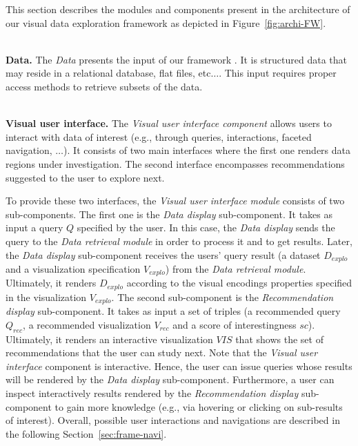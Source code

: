 This section describes the modules and components present in the architecture of our visual data exploration framework as depicted in Figure~\ref{fig:archi-FW}.

~~\\
\noindent \textbf{Data.}
The \emph{Data} presents the input of our framework \framework{}.
It is structured data that may reside in a relational database, flat files, etc$\ldots$. This input requires proper access methods to retrieve subsets of the data.

~~\\
\noindent \textbf{Visual user interface.}
The \emph{Visual user interface component} allows users to interact with data of interest (e.g.,  through queries, interactions, faceted navigation, $\ldots$).
It consists of two main interfaces where the first one renders data regions under investigation. The second interface encompasses recommendations suggested to the user to explore next.

To provide these two interfaces, the \emph{Visual user interface module} consists of two sub-components. The first one is the \emph{Data display} sub-component. 
It takes as input a query $Q$ specified by the user. In this case, the \emph{Data display} sends the query
to the \emph{Data retrieval module} in order to process it and to get results.
Later, the \emph{Data display} sub-component receives the users' query result (a dataset $D_{explo}$ and a visualization specification $V_{explo}$) from the \emph{Data retrieval module}.
Ultimately, it renders $D_{explo}$ according to the visual encodings properties specified in the visualization $V_{explo}$.
The second sub-component is the \emph{Recommendation display} sub-component. It takes as input a set of triples (a recommended query $Q_{rec}$, a recommended visualization $V_{rec}$ and a score of interestingness $sc$).
Ultimately, it renders an interactive visualization $VIS$ that shows the set of recommendations that the user can study next.
Note that the \emph{Visual user interface} component is interactive. Hence, the user can issue queries whose results will be rendered by the \emph{Data display} sub-component. Furthermore, a user can inspect interactively results rendered by the \emph{Recommendation display} sub-component to gain more knowledge (e.g., via hovering or clicking on sub-results of interest). Overall, possible user interactions and navigations are described in the following Section~\ref{sec:frame-navi}.




